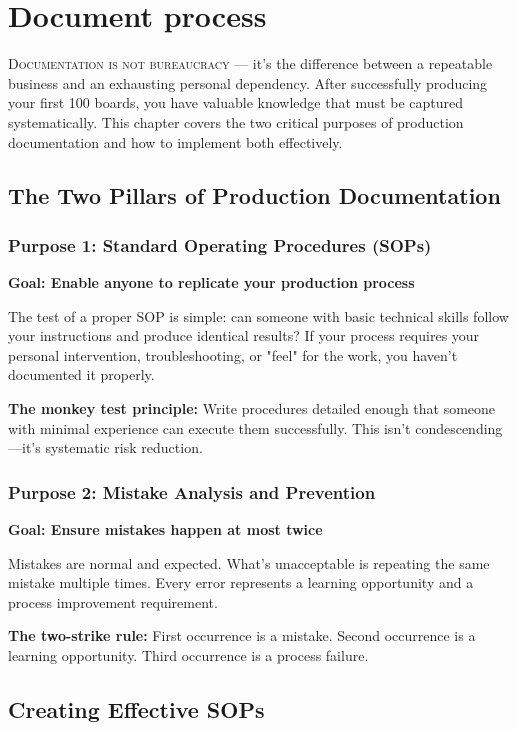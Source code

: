 \chapter{Document process}

\lettrine{D}{ocumentation is not bureaucracy} — it's the difference between a repeatable business and an exhausting personal dependency. After successfully producing your first 100 boards, you have valuable knowledge that must be captured systematically. This chapter covers the two critical purposes of production documentation and how to implement both effectively.

\section{The Two Pillars of Production Documentation}

\subsection{Purpose 1: Standard Operating Procedures (SOPs)}

\textbf{Goal: Enable anyone to replicate your production process}

The test of a proper SOP is simple: can someone with basic technical skills follow your instructions and produce identical results? If your process requires your personal intervention, troubleshooting, or "feel" for the work, you haven't documented it properly.

\textbf{The monkey test principle:} Write procedures detailed enough that someone with minimal experience can execute them successfully. This isn't condescending—it's systematic risk reduction.

\subsection{Purpose 2: Mistake Analysis and Prevention}

\textbf{Goal: Ensure mistakes happen at most twice}

Mistakes are normal and expected. What's unacceptable is repeating the same mistake multiple times. Every error represents a learning opportunity and a process improvement requirement.

\textbf{The two-strike rule:} First occurrence is a mistake. Second occurrence is a learning opportunity. Third occurrence is a process failure.

\section{Creating Effective SOPs}

